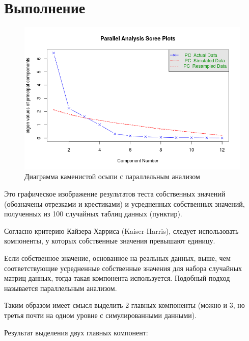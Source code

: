 \documentclass{article} %
\begin{document}
\section*{Выполнение}
\begin{figure}[H]
    \centering
    \includegraphics[width=\textwidth]{scree}
    \caption{Диаграмма каменистой осыпи с параллельным анализом}
\end{figure}

Это графическое изображение результатов теста собственных значений
(обозначены отрезками и крестиками) и усредненных собственных
значений, полученных из 100 случайных таблиц данных (пунктир).

Согласно критерию Кайзера-Харриса (Kaiser-Harris),
следует использовать компоненты, у которых собственные значения
превышают единицу.

Если собственное значение, основанное на реальных данных,
выше, чем соответствующие усредненные собственные значения для
набора случайных матриц данных, тогда такая компонента используется.
Подобный подход называется параллельным анализом.

Таким образом имеет смысл выделить 2 главных компоненты
(можно и 3, но третья почти на одном уровне с симулированными данными).

Результат выделения двух главных компонент:
\end{document}
